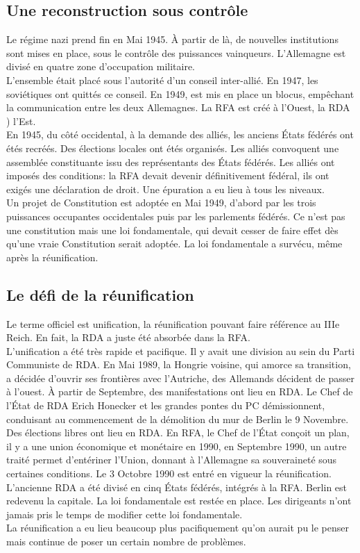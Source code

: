 \documentclass[10pt, a4paper, openany]{book}
\begin{document}
\subsection{Une reconstruction sous contrôle}

Le régime nazi prend fin en Mai 1945. À partir de là, de nouvelles institutions sont mises en place, sous le contrôle des puissances vainqueurs. L'Allemagne est divisé en quatre zone d'occupation militaire. \\
L'ensemble était placé sous l'autorité d'un conseil inter-allié. En 1947, les soviétiques ont quittés ce conseil. En 1949, est mis en place un blocus, empêchant la communication entre les deux Allemagnes. La RFA est créé à l'Ouest, la RDA ) l'Est. \\
En 1945, du côté occidental, à la demande des alliés, les anciens États fédérés ont étés recréés. Des élections locales ont étés organisés. Les alliés convoquent une assemblée constituante issu des représentants des États fédérés. Les alliés ont imposés des conditions: la RFA devait devenir définitivement fédéral, ils ont exigés une déclaration de droit. Une épuration a eu lieu à tous les niveaux. \\
Un projet de Constitution est adoptée en Mai 1949, d'abord par les trois puissances occupantes occidentales puis par les parlements fédérés. Ce n'est pas une constitution mais une loi fondamentale, qui devait cesser de faire effet dès qu'une vraie Constitution serait adoptée. La loi fondamentale a survécu, même après la réunification. 

\subsection{Le défi de la réunification}

Le terme officiel est unification, la réunification pouvant faire référence au IIIe Reich. En fait, la RDA a juste été absorbée dans la RFA. \\
L'unification a été très rapide et pacifique. Il y avait une division au sein du Parti Communiste de RDA. En Mai 1989, la Hongrie voisine, qui amorce sa transition, a décidée d'ouvrir ses frontières avec l'Autriche, des Allemands décident de passer à l'ouest. À partir de Septembre, des manifestations ont lieu en RDA. Le Chef de l'État de RDA Erich Honecker et les grandes pontes du PC démissionnent, conduisant au commencement de la démolition du mur de Berlin le 9 Novembre. Des élections libres ont lieu en RDA. En RFA, le Chef de l'État conçoit un plan, il y a une union économique et monétaire en 1990, en Septembre 1990, un autre traité permet d'entériner l'Union, donnant à l'Allemagne sa souveraineté sous certaines conditions. Le 3 Octobre 1990 est entré en vigueur la réunification. \\
L'ancienne RDA a été divisé en cinq États fédérés, intégrés à la RFA. Berlin est redevenu la capitale. La loi fondamentale est restée en place. Les dirigeants n'ont jamais pris le temps de modifier cette loi fondamentale. \\
La réunification a eu lieu beaucoup plus pacifiquement qu'on aurait pu le penser mais continue de poser un certain nombre de problèmes. 
\end{document}
